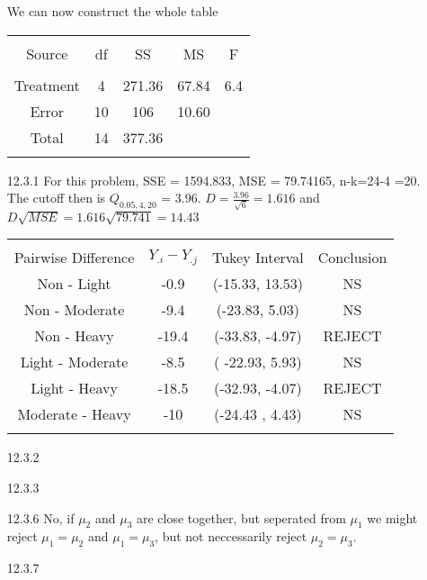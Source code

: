 \documentclass[11pt,fleqn]{article}
\begin{document}
\begin{enumerate}
We can now construct the whole table

\begin{tabular}{c c c c c}
\hline \\
Source & df & SS & MS & F \\
\hline \\
Treatment & 4 & 271.36 & 67.84 & 6.4 \\
Error & 10 & 106 & 10.60 &  \\
Total & 14 & 377.36 & & \\
\hline\\
\end{tabular}
  \item[12.3.1]
  For this problem, SSE = 1594.833, MSE = 79.74165, n-k=24-4 =20. The cutoff
  then is $Q_{0.05,4,20}$ = 3.96. $D = \frac{3.96}{\sqrt{6}} = 1.616$ and
  $D\sqrt{MSE} = 1.616\sqrt{79.741} = 14.43$
  
  \begin{tabular}{c c c c}
  \hline \\
  Pairwise Difference & $Y_{.i}-Y_{.j}$ & Tukey Interval & Conclusion \\
  \hline
  Non - Light & -0.9 & (-15.33, 13.53) & NS \\
  Non - Moderate & -9.4 & (-23.83, 5.03) & NS  \\
  Non - Heavy & -19.4 & (-33.83, -4.97) & REJECT \\
  Light - Moderate & -8.5 & ( -22.93, 5.93) & NS \\
  Light - Heavy & -18.5 & (-32.93, -4.07) & REJECT \\
  Moderate - Heavy & -10 & (-24.43 , 4.43) & NS  \\
  \hline \\
  
  \end{tabular}
  \item[12.3.2]
  
  \item[12.3.3]
  
  \item[12.3.6]
  No, if $\mu_2$ and $\mu_3$ are close together, but seperated from $\mu_1$ we
  might reject $\mu_1=\mu_2$ and $\mu_1=\mu_3$, but not neccessarily reject
  $\mu_2=\mu_3$.
  \item[12.3.7]
  
\end{enumerate}
\end{document}
